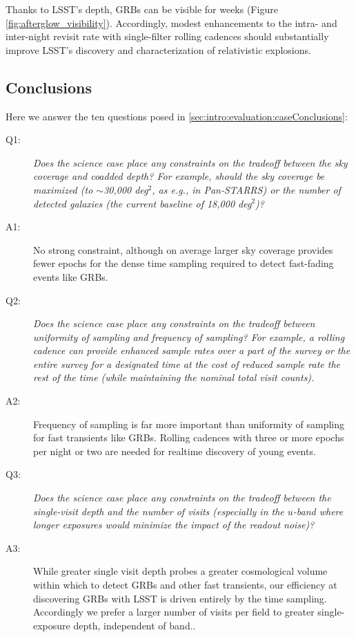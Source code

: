Thanks to LSST's depth, GRBs can be visible for weeks (Figure
\ref{fig:afterglow_visibility}).  Accordingly,
modest enhancements to the intra- and inter-night revisit rate with
single-filter rolling cadences should substantially improve LSST's
discovery and characterization of relativistic explosions.


\subsection{Conclusions}

Here we answer the ten questions posed in
\autoref{sec:intro:evaluation:caseConclusions}:

\begin{description}

\item[Q1:] {\it Does the science case place any constraints on the
tradeoff between the sky coverage and coadded depth? For example, should
the sky coverage be maximized (to $\sim$30,000 deg$^2$, as e.g., in
Pan-STARRS) or the number of detected galaxies (the current baseline 
of 18,000 deg$^2$)?}

\item[A1:] No strong constraint, although on average
	larger sky coverage provides fewer epochs for the dense time sampling
	required to detect fast-fading events like GRBs.

\item[Q2:] {\it Does the science case place any constraints on the
tradeoff between uniformity of sampling and frequency of  sampling? For
example, a rolling cadence can provide enhanced sample rates over a part
of the survey or the entire survey for a designated time at the cost of
reduced sample rate the rest of the time (while maintaining the nominal
total visit counts).}

\item[A2:]  Frequency of sampling is far more important than uniformity of
	sampling for fast transients like GRBs.  Rolling cadences with
		three or more epochs per night or two are needed for
		realtime discovery of young events.

\item[Q3:] {\it Does the science case place any constraints on the
tradeoff between the single-visit depth and the number of visits
(especially in the $u$-band where longer exposures would minimize the
impact of the readout noise)?}

\item[A3:]  While greater single visit depth probes a greater cosmological
	volume within which to detect GRBs and other fast transients,
		our efficiency at discovering
		GRBs with LSST is driven entirely by the time sampling.
		Accordingly we prefer a larger number of visits per field
		to greater single-exposure depth, independent of band..


\end{description}

